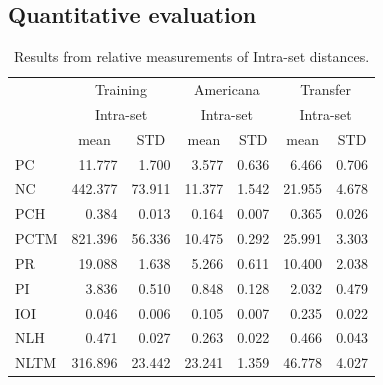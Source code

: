 \documentclass{IEEEtran}
\begin{document}
    \subsection{Quantitative evaluation}
        \begin{table}
            \begin{center}
            \caption{
                Results from relative measurements of Intra-set distances.
                \label{tab:q_results}
            }
            \begin{tabular}{l|rr|rr|rr}
            \multirow{3}{*}{} &
            \multicolumn{2}{c|}{Training} &
            \multicolumn{2}{c|}{Americana} &
            \multicolumn{2}{c}{Transfer} \\ \cline{2-7} 
            &
            \multicolumn{2}{c|}{Intra-set} &
            \multicolumn{2}{c|}{Intra-set} &
            \multicolumn{2}{c}{Intra-set} \\ \cline{2-7} 
            &
            \multicolumn{1}{c|}{mean} &
            \multicolumn{1}{c|}{STD} &
            \multicolumn{1}{c|}{mean} &
            \multicolumn{1}{c|}{STD} &
            \multicolumn{1}{c|}{mean} &
            \multicolumn{1}{c}{STD} \\ \hline
            PC   & 11.777  & 1.700  & 3.577  & 0.636 & 6.466  & 0.706 \\
            NC   & 442.377 & 73.911 & 11.377 & 1.542 & 21.955 & 4.678 \\
            PCH  & 0.384   & 0.013  & 0.164  & 0.007 & 0.365  & 0.026 \\
            PCTM & 821.396 & 56.336 & 10.475 & 0.292 & 25.991 & 3.303 \\
            PR   & 19.088  & 1.638  & 5.266  & 0.611 & 10.400 & 2.038 \\
            PI   & 3.836   & 0.510  & 0.848  & 0.128 & 2.032  & 0.479 \\
            IOI  & 0.046   & 0.006  & 0.105  & 0.007 & 0.235  & 0.022 \\
            NLH  & 0.471   & 0.027  & 0.263  & 0.022 & 0.466  & 0.043 \\
            NLTM & 316.896 & 23.442 & 23.241 & 1.359 & 46.778 & 4.027
            \end{tabular}
            \end{center}
            \end{table}
\end{document}
